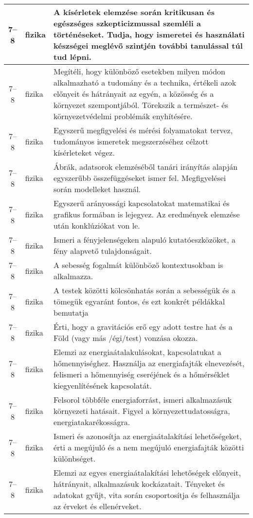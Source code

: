 \begin{small}
\begin{longtable}{c | p{2cm} |  p{11cm} }
              7--8 & fizika & A kísérletek elemzése során kritikusan és egészséges szkepticizmussal szemléli a történéseket. Tudja, hogy ismeretei és használati készségei meglévő szintjén további tanulással túl tud lépni. \\ \hline
              7--8 & fizika & Megítéli, hogy különböző esetekben milyen módon alkalmazható a tudomány és a technika, értékeli azok előnyeit és hátrányait az egyén, a közösség és a környezet szempontjából. Törekszik a természet- és környezetvédelmi problémák enyhítésére. \\ \hline
              7--8 & fizika & Egyszerű megfigyelési és mérési folyamatokat tervez, tudományos ismeretek megszerzéséhez célzott kísérleteket végez. \\ \hline
              7--8 & fizika & Ábrák, adatsorok elemzéséből tanári irányítás alapján egyszerűbb összefüggéseket ismer fel. Megfigyelései során modelleket használ.  \\ \hline
              7--8 & fizika & Egyszerű arányossági kapcsolatokat matematikai és grafikus formában is lejegyez. Az eredmények elemzése után konklúziókat von le. \\ \hline
              7--8 & fizika & Ismeri a fényjelenségeken alapuló kutatóeszközöket, a fény alapvető tulajdonságait. \\ \hline
              7--8 & fizika & A sebesség fogalmát különböző kontextusokban is alkalmazza. \\ \hline
              7--8 & fizika & A testek közötti kölcsönhatás során a sebességük és a tömegük egyaránt fontos, és ezt konkrét példákkal bemutatja \\ \hline
              7--8 & fizika & Érti, hogy a gravitációs erő egy adott testre hat és a Föld (vagy más /égi/test) vonzása okozza. \\ \hline
              7--8 & fizika & Elemzi az energiaátalakulásokat, kapcsolatukat a hőmennyiséghez. Használja az energiafajták elnevezését, felismeri a hőmennyiség cseréjének és a hőmérséklet kiegyenlítésének kapcsolatát. \\ \hline
              7--8 & fizika & Felsorol többféle energiaforrást, ismeri alkalmazásuk környezeti hatásait. Figyel a környezettudatosságra, energiatakarékosságra. \\ \hline
              7--8 & fizika & Ismeri és azonosítja az energiaátalakítási lehetőségeket, érti a megújuló és a nem megújuló energiafajták közötti különbséget. \\ \hline
              7--8 & fizika & Elemzi az egyes energiaátalakítási lehetőségek előnyeit, hátrányait, alkalmazásuk kockázatait. Tényeket és adatokat gyűjt, vita során csoportosítja és felhasználja az érveket és ellenérveket. \\ \hline

\end{longtable}
\end{small}
